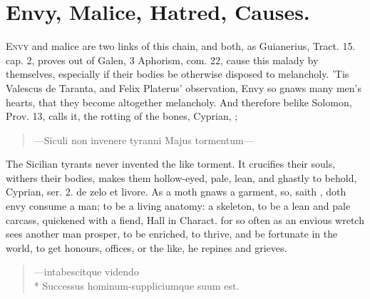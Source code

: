 {{%
\clearpage{}
\thispagestyle{titleontop}

\section{Envy, Malice, Hatred, Causes.}
\lettrine{E}{nvy} and malice are two links of this chain, and both, as Guianerius,
Tract. 15. cap. 2, proves out of Galen, 3 Aphorism, com. 22, 
cause this malady by themselves, especially if their bodies be
otherwise disposed to melancholy. 'Tis Valescus de Taranta, and Felix
Platerus' observation, Envy so gnaws many men's hearts, that they
become altogether melancholy. And therefore belike Solomon, Prov. 
13, calls it, the rotting of the bones, Cyprian, ;

\begin{latin}
\begin{verse}%
---Siculi non invenere tyranni
Majus tormentum---
\end{verse}%
\end{latin}

The Sicilian tyrants never invented the like torment. It crucifies
their souls, withers their bodies, makes them hollow-eyed, pale,
lean, and ghastly to behold, Cyprian, ser. 2. de zelo et livore.
As a moth gnaws a garment, so, saith \Chrysostom{}, doth envy
consume a man; to be a living anatomy: a skeleton, to be a lean and
pale carcass, quickened with a fiend, Hall in Charact. for
so often as an envious wretch sees another man prosper, to be enriched,
to thrive, and be fortunate in the world, to get honours, offices, or
the like, he repines and grieves.

\begin{verse}
---\textlatin{intabescitque videndo\\*
  Successus hominum-suppliciumque suum est}.
\end{verse}

}}
